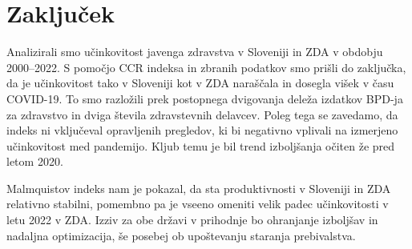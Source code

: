 \documentclass[12pt,a4paper]{article}
\theoremstyle{definition}
\begin{document}
\section{Zaključek}

Analizirali smo učinkovitost javenga zdravstva v Sloveniji in ZDA
v obdobju 2000--2022. S pomočjo CCR indeksa in zbranih podatkov
smo prišli do zaključka, da je učinkovitost tako v Sloveniji kot
v ZDA naraščala in dosegla višek v času COVID-19. To smo
razložili prek postopnega dvigovanja deleža izdatkov BPD-ja za zdravstvo in
dviga števila zdravstevnih delavcev. Poleg tega se zavedamo, da indeks ni vključeval 
opravljenih pregledov, ki bi negativno vplivali na izmerjeno učinkovitost med pandemijo.
Kljub temu je bil trend izboljšanja očiten že pred letom 2020.

Malmquistov indeks nam je pokazal, da sta produktivnosti v Sloveniji
in ZDA relativno stabilni, pomembno pa je vseeno omeniti velik padec
učinkovitosti v letu 2022 v ZDA. Izziv za obe državi v prihodnje bo ohranjanje izboljšav in nadaljna optimizacija,
še posebej ob upoštevanju staranja prebivalstva.

\nocite*{}


\end{document}
